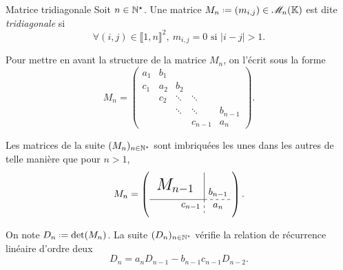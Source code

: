 \begin{defi}{Matrice tridiagonale}
    Soit $n \in \mathbb{N}^\star$. Une matrice $M_n \defeq (m_{i,j}) \in \M_n(\K)$ est dite \emph{tridiagonale} si
    $$\forall (i,j) \in \llbracket 1, n \rrbracket^2,\ m_{i,j} = 0 \text{ si } |i-j| > 1.$$
\end{defi}

Pour mettre en avant la structure de la matrice $M_n$, on l'écrit sous la forme
$$
M_n = \begin{pmatrix}
a_1 & b_1 \\
c_1 & a_2 & b_2 \\
& c_2 & \ddots & \ddots \\
& & \ddots & \ddots & b_{n-1} \\
& & & c_{n-1} & a_n
\end{pmatrix}.
$$

\newcommand{\mattrign}{
\left(\begin{gathered}
    \tikzpicture[every node/.style={anchor=south west}]
        \node[minimum width=1.5cm,minimum height=1cm] at (0.125,0.5) {\LARGE $M_{n-1}$};
        \node[minimum width=1.5cm,minimum height=0.5cm] at (0.75,0) {$c_{n-1}$};
        \node[minimum width=1cm,minimum height=0.5cm] at (2,0) {$a_n$};
        \node[minimum width=1cm,minimum height=1cm] at (2,0.25) {$b_{n-1}$};
        \draw (0,0.5) -- (2,0.5);
        \draw (2,0.5) -- (2,1.5);
        \draw[dashed] (2,0.5) -- (3,0.5);
        \draw[dashed] (2,0.5) -- (2,0);
    \endtikzpicture
    \end{gathered}\right)
}

\begin{remarque}
    Les matrices de la suite $(M_n)_{n \in \mathbb{N}^\star}$ sont imbriquées les unes dans les autres de telle manière que pour $n > 1$,
    $$M_n = \mattrign.$$
\end{remarque}


\begin{prop}{}
    On note $D_n \defeq \det(M_n)$. La suite $(D_n)_{n \in \mathbb{N}^\star}$ vérifie la relation de récurrence linéaire d'ordre deux 
    $$D_n = a_n D_{n-1} - b_{n-1}c_{n-1}D_{n-2}.$$
\end{prop}

\newcommand{\dettrign}{
\left|\begin{gathered}
    \tikzpicture[every node/.style={anchor=south west}]
        \node[minimum width=1.5cm,minimum height=1cm] at (0.125,0.5) {\LARGE $M_{n-1}$};
        \node[minimum width=1.5cm,minimum height=0.5cm] at (0.75,0) {$c_{n-1}$};
        \node[minimum width=1cm,minimum height=0.5cm] at (2,0) {$a_n$};
        \node[minimum width=1cm,minimum height=1cm] at (2,0.25) {$b_{n-1}$};
        \draw (0,0.5) -- (2,0.5);
        \draw (2,0.5) -- (2,1.5);
        \draw[dashed] (2,0.5) -- (3,0.5);
        \draw[dashed] (2,0.5) -- (2,0);
    \endtikzpicture
    \end{gathered}\right|
}

